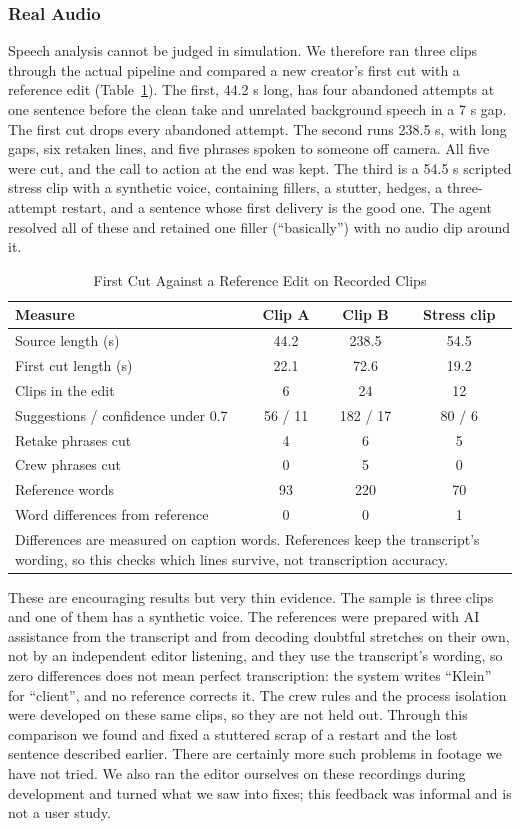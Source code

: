 \documentclass{ieeeaccess}
\begin{document}
\subsubsection{Real Audio}
Speech analysis cannot be judged in simulation. We therefore ran three clips through the actual pipeline and compared a new creator's first cut with a reference edit (Table~\ref{tab:real}). The first, 44.2 s long, has four abandoned attempts at one sentence before the clean take and unrelated background speech in a 7 s gap. The first cut drops every abandoned attempt. The second runs 238.5 s, with long gaps, six retaken lines, and five phrases spoken to someone off camera. All five were cut, and the call to action at the end was kept. The third is a 54.5 s scripted stress clip with a synthetic voice, containing fillers, a stutter, hedges, a three-attempt restart, and a sentence whose first delivery is the good one. The agent resolved all of these and retained one filler (``basically'') with no audio dip around it.

\begin{table}[t]
\caption{First Cut Against a Reference Edit on Recorded Clips}
\label{tab:real}
\setlength{\tabcolsep}{3pt}
\centering
\begin{tabular}{|p{33mm}|c|c|c|}
\hline
Measure & Clip A & Clip B & Stress clip \\
\hline
Source length (s) & 44.2 & 238.5 & 54.5 \\
First cut length (s) & 22.1 & 72.6 & 19.2 \\
Clips in the edit & 6 & 24 & 12 \\
Suggestions / confidence under 0.7 & 56 / 11 & 182 / 17 & 80 / 6 \\
Retake phrases cut & 4 & 6 & 5 \\
Crew phrases cut & 0 & 5 & 0 \\
Reference words & 93 & 220 & 70 \\
Word differences from reference & 0 & 0 & 1 \\
\hline
\multicolumn{4}{p{80mm}}{Differences are measured on caption words. References keep the transcript's wording, so this checks which lines survive, not transcription accuracy.}
\end{tabular}
\end{table}

These are encouraging results but very thin evidence. The sample is three clips and one of them has a synthetic voice. The references were prepared with AI assistance from the transcript and from decoding doubtful stretches on their own, not by an independent editor listening, and they use the transcript's wording, so zero differences does not mean perfect transcription: the system writes ``Klein'' for ``client'', and no reference corrects it. The crew rules and the process isolation were developed on these same clips, so they are not held out. Through this comparison we found and fixed a stuttered scrap of a restart and the lost sentence described earlier. There are certainly more such problems in footage we have not tried. We also ran the editor ourselves on these recordings during development and turned what we saw into fixes; this feedback was informal and is not a user study.
\end{document}
